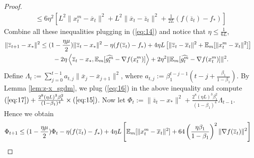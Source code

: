 \documentclass{article} %
\numberwithin{equation}{section}
\renewcommand{\eqref}[1]{(\ref{#1})}
\begin{document}
\begin{proof}
\begin{equation}
\begin{aligned}
            &\leq 6\eta^2\left[L^2\|x_t^m-\overline{x}_t\|^2+L^2\|\overline{x}_t-\overline{z}_t\|^2+\frac{1}{2L}(f(\overline{z}_t)-f_*)\right]
        \end{aligned}
    \end{equation}
    Combine all these inequalities plugging in \eqref{eq:14} and notice that $\eta\leq \frac{1}{6L}$,
    \begin{equation}\label{eq:17}
        \begin{aligned}
            \|\overline{z}_{t+1}-x_*\|^2
            &\leq (1-\frac{\eta\mu}{2})\|\overline{z}_t-x_*\|^2 - \eta (f(\overline{z}_t)-f_*) + 4\eta L \left[\|\overline{z}_t-\overline{x}_t\|^2+\mathbb{E}_m[\|x_t^m-\overline{x}_t\|^2]\right] \\
            &\qquad - 2\eta \left\langle\overline{z}_t-x_*, \mathbb{E}_m [\widehat{g_t^m}-\nabla f(x_t^m)]\right\rangle + 2\eta^2\|\mathbb{E}_m [\widehat{g_t^m}-\nabla f(x_t^m)]\|^2.
        \end{aligned}
    \end{equation}
    Define $\Lambda_t:= \sum_{j=0}^{t-1}a_{t,j}\|\overline{x}_j-\overline{x}_{j+1}\|^2$, where $a_{t,j}:=\beta_1^{t-j-1}(t-j+\frac{\beta_1}{1-\beta_1})$.
    By Lemma \ref{lem:z-x_sgdm}, we plug \eqref{eq:16} in the above inequality and compute $\eqref{eq:17}+\frac{2^8(\eta L)^3\beta_1^2}{(1-\beta_1)^4}\times\eqref{eq:15}$.
    Now let $\Phi_t:=\|\overline{z}_t-x_*\|^2 + \frac{2^8(\eta L)^3\beta_1^2}{(1-\beta_1)^4}\Lambda_{t-1}$. 
    Hence we obtain
    \begin{equation}
        \begin{aligned}
            \Phi_{t+1}
            &\leq (1-\frac{\eta\mu}{2}) \Phi_t - \eta (f(\overline{z}_t)-f_*) + 4\eta L \left[\expect_m[\|x_t^m-\overline{x}_t\|^2]+64\left(\frac{\eta\beta_1}{1-\beta_1}\right)^2\|\nabla f(\overline{z}_t)\|^2\right]\\

\end{aligned}
\end{equation}
\end{proof}
\end{document}
